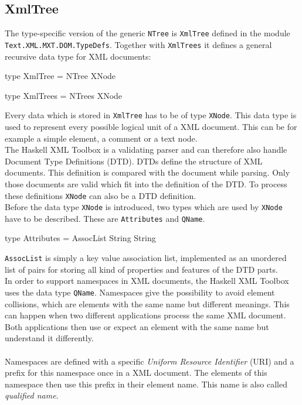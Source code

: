 \documentclass[11pt,a4paper,headsepline, bibtotoc]{scrreprt}
\begin{document}
\subsection{XmlTree}\label{xmltree}
The type-specific version of the generic {\tt NTree} is {\tt XmlTree} defined in the module {\tt Text\-.XML\-.MXT.DOM.TypeDefs}. Together with {\tt XmlTrees} it defines a general recursive data type for XML documents:
\clearpage
\begin{code}
type XmlTree = NTree XNode

type XmlTrees = NTrees XNode
\end{code}
Every data which is stored in {\tt XmlTree} has to be of type {\tt XNode}. This data type is used to represent every possible logical unit of a XML document. This can be for example a simple element, a comment or a text node.\\
The Haskell XML Toolbox is a validating parser and can therefore also handle Document Type Definitions (DTD). DTDs define the structure of XML documents. This definition is compared with the document while parsing. Only those documents are valid which fit into the definition of the DTD. To process these definitions {\tt XNode} can also be a DTD definition.\\
Before the data type {\tt XNode} is introduced, two types which are used by {\tt XNode} have to be described. These are {\tt Attributes} and {\tt QName}.
\begin{code}
type Attributes = AssocList String String
\end{code} 
{\tt AssocList} is simply a key value association list, implemented as an unordered list of pairs for storing all kind of properties and features of the DTD parts.\\
In order to support namespaces \cite{XML-NS} in XML documents, the Haskell XML Toolbox uses the data type {\tt QName}. Namespaces give the possibility to avoid element collisions, which are elements with the same name but different meanings. This can happen when two different applications process the same XML document. Both applications then use or expect an element with the same name but understand it differently.\\
\\
Namespaces are defined with a specific \textit{Uniform Resource Identifier} (URI) and a prefix for this namespace once in a XML document. The elements of this namespace then use this prefix in their element name. This name is also called \textit{qualified name}.\\
\end{document}
